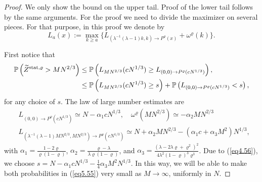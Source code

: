 \documentclass[12pt,a4paper]{article}
\numberwithin{equation}{section}
\newcommand{\Pb}{\mathbb{P}}
\begin{document}
\begin{proof}
We only show the bound on the upper tail. Proof of the lower tail follows by the same arguments.
For the proof we need to divide the maximizer on several pieces. For that purpose, in this proof we denote by
\begin{equation}
L_{a}(x):=\max_{k\geq a} \{L_{(\lambda^{-1}(\lambda-1) k,k)\to P^\varrho(x)}+\omega^\varrho(k)\}.
\end{equation}

First notice that
\begin{equation}\label{eq5.55}
\begin{aligned}
\Pb\left(\widetilde Z^{{\rm stat},\varrho}>MN^{2/3}\right)&\leq \Pb\left(L_{M N^{2/3}}(c N^{1/3}) \geq L_{(0,0)\to P^\varrho(c N^{1/3})}\right),\\
&\leq \Pb\left(L_{M N^{2/3}}(c N^{1/3})\geq s\right)+\Pb\left(L_{(0,0)\to P^\varrho(c N^{1/3})}<s\right),
\end{aligned}
\end{equation}
for any choice of $s$. The law of large number estimates are
\begin{equation}\label{eq4.56}
\begin{aligned}
&L_{(0,0)\to P^\varrho(c N^{1/3})} \simeq N-\alpha_1 cN^{1/3}, \quad \omega^\varrho(MN^{2/3})\simeq -\alpha_2 M N^{2/3}\\
&L_{(\lambda^{-1}(\lambda-1) M N^{2/3},M N^{2/3})\to P^\varrho(cN^{1/3})} \simeq N + \alpha_2 M N^{2/3}-(\alpha_1 c +\alpha_3 M^2)N^{1/3},
\end{aligned}
\end{equation}
with $\alpha_1=\frac{1-2\varrho}{\varrho(1-\varrho)}$, $\alpha_2=\frac{\varrho-\lambda}{\lambda \varrho (1-\varrho)}$, and $\alpha_3=\frac{(\lambda-2\lambda\varrho+\varrho^2)^2}{4\lambda^2(1-\varrho)^3\varrho^3}$. Due to (\ref{eq4.56}), we choose $s=N-\alpha_1 c N^{1/3}-\frac14\alpha_3 M^2 N^{1/3}$. In this way, we will be able to make both probabilities in (\ref{eq5.55}) very small as $M\to\infty$, uniformly in $N$.


\end{proof}
\end{document}
